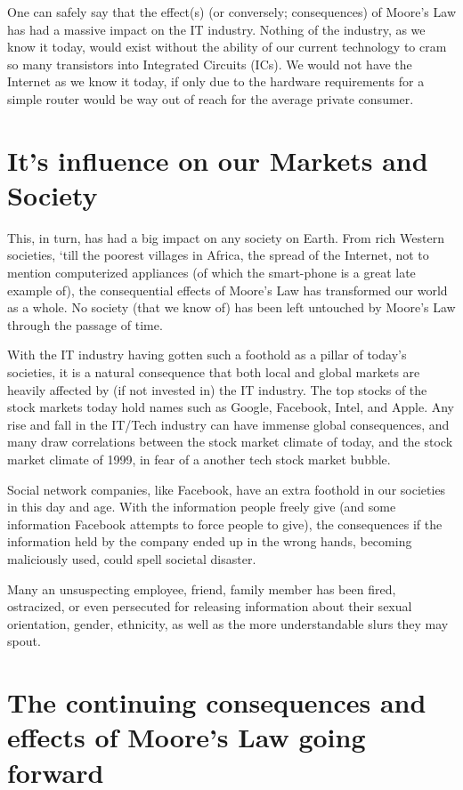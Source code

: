 \documentclass[a4paper,12pt]{article}
\begin{document}
One can safely say that the effect(s) (or conversely; consequences) of Moore's Law has had a massive impact on the IT industry.
Nothing of the industry, as we know it today, would exist without the ability of our current technology to cram so many transistors into Integrated Circuits (ICs).
We would not have the Internet as we know it today, if only due to the hardware requirements for a simple router would be way out of reach for the average private consumer.

\section*{It's influence on our Markets and Society}

This, in turn, has had a big impact on any society on Earth.
From rich Western societies, `till the poorest villages in Africa, the spread of the Internet, not to mention computerized appliances (of which the smart-phone is a great late example of), the consequential effects of Moore's Law has transformed our world as a whole.
No society (that we know of) has been left untouched by Moore's Law through the passage of time.

With the IT industry having gotten such a foothold as a pillar of today's societies, it is a natural consequence that both local and global markets are heavily affected by (if not invested in) the IT industry.
The top stocks of the stock markets today hold names such as Google, Facebook, Intel, and Apple\cite{ITstockMarkets}.
Any rise and fall in the IT/Tech industry can have immense global consequences, and many draw correlations between the stock market climate of today, and the stock market climate of 1999, in fear of a another tech stock market bubble\cite{TechBubbleBursting}.

Social network companies, like Facebook, have an extra foothold\cite{FacebookInternetAfrica} in our societies in this day and age.
With the information people freely give (and some information Facebook attempts to force people to give\cite{FacebookRealNamePolicyConsequences}), the consequences if the information held by the company ended up in the wrong hands, becoming maliciously used, could spell societal disaster.

Many an unsuspecting employee, friend, family member has been fired, ostracized, or even persecuted for releasing information about their sexual orientation, gender, ethnicity, as well as the more understandable slurs they may spout.

\section*{The continuing consequences and effects of Moore's Law going forward}
\end{document}
